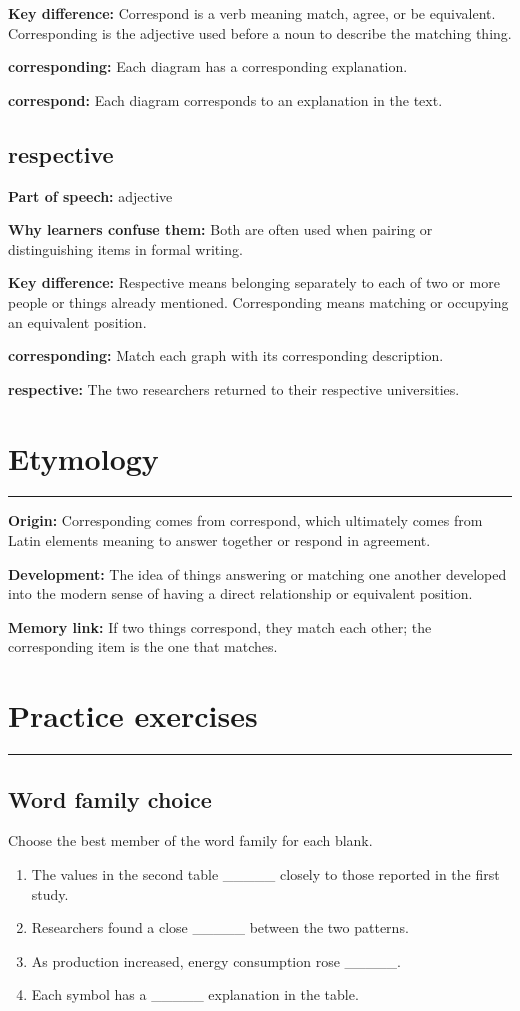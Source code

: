 \documentclass[11pt]{article}
\newcommand{\sectionrule}{\par\vspace{-0.5em}\noindent\textcolor{Accent}{\rule{\linewidth}{0.6pt}}\par}
\begin{document}
\textbf{Key difference:} Correspond is a verb meaning match, agree, or be equivalent. Corresponding is the adjective used before a noun to describe the matching thing.

\textbf{corresponding:} Each diagram has a corresponding explanation.

\textbf{correspond:} Each diagram corresponds to an explanation in the text.

\subsection{respective}
\textbf{Part of speech:} adjective

\textbf{Why learners confuse them:} Both are often used when pairing or distinguishing items in formal writing.

\textbf{Key difference:} Respective means belonging separately to each of two or more people or things already mentioned. Corresponding means matching or occupying an equivalent position.

\textbf{corresponding:} Match each graph with its corresponding description.

\textbf{respective:} The two researchers returned to their respective universities.

\section{Etymology}
\sectionrule
\textbf{Origin:} Corresponding comes from correspond, which ultimately comes from Latin elements meaning to answer together or respond in agreement.

\textbf{Development:} The idea of things answering or matching one another developed into the modern sense of having a direct relationship or equivalent position.

\textbf{Memory link:} If two things correspond, they match each other; the corresponding item is the one that matches.

\section{Practice exercises}
\sectionrule
\subsection{Word family choice}
Choose the best member of the word family for each blank.

\begin{enumerate}
  \item The values in the second table \_\_\_\_\_ closely to those reported in the first study.
  \item Researchers found a close \_\_\_\_\_ between the two patterns.
  \item As production increased, energy consumption rose \_\_\_\_\_.
  \item Each symbol has a \_\_\_\_\_ explanation in the table.
\end{enumerate}
\end{document}
